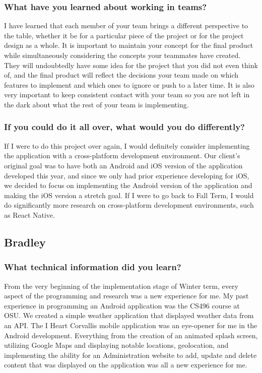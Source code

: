 \documentclass[onecolumn, draftclsnofoot,10pt, compsoc]{IEEEtran}
\begin{document}
    \subsubsection{What have you learned about working in teams?}
      I have learned that each member of your team brings a different perspective to the table, whether it be for a particular piece of the project or for the project design as a whole. It is important to maintain your concept for the final product while simultaneously considering the concepts your teammates have created. They will undoubtedly have some idea for the project that you did not even think of, and the final product will reflect the decisions your team made on which features to implement and which ones to ignore or push to a later time. It is also very important to keep consistent contact with your team so you are not left in the dark about what the rest of your team is implementing.

    \subsubsection{\textbf{If you could do it all over, what would you do differently?}}
      If I were to do this project over again, I would definitely consider implementing the application with a cross-platform development environment. Our client's original goal was to have both an Android and iOS version of the application developed this year, and since we only had prior experience developing for iOS, we decided to focus on implementing the Android version of the application and making the iOS version a stretch goal. If I were to go back to Fall Term, I would do significantly more research on cross-platform development environments, such as React Native.

  \subsection{Bradley}
    \subsubsection{What technical information did you learn?}
      From the very beginning of the implementation stage of Winter term, every aspect of the programming and research was a new experience for me. My past experience in programming an Android application was the CS496 course at OSU.  We created a simple weather application that displayed weather data from an API. The I Heart Corvallis mobile application was an eye-opener for me in the Android development. Everything from the creation of an animated splash screen, utilizing Google Maps and displaying notable locations, geolocation, and implementing the ability for an Administration website to add, update and delete content that was displayed on the application was all a new experience for me.
\end{document}
